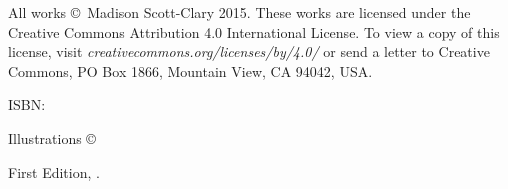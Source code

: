 \singlespacing
\thispagestyle{empty}
\null
\vfill
{\small\parindent0pt
\noindent All works \copyright\ Madison Scott-Clary 2015. These works are licensed under the Creative Commons Attribution 4.0 International License. To view a copy of this license, visit \mbox{\emph{creativecommons.org/licenses/by/4.0/}} or send a letter to Creative Commons, PO Box 1866, Mountain View, CA 94042, USA.

\vspace{1ex}

ISBN: \ISBN

\vspace{1ex}

\emph{\Title}

\vspace{1ex}

Illustrations \copyright\ \Year\ \Illustrator\\
\IllustratorWeb

\vspace{1ex}

First Edition, \Year.

\EditionsList
}

\cleardoublepage
